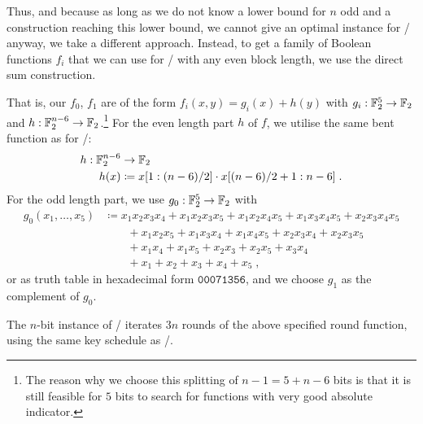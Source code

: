 Thus, and because as long as we do not know a lower bound for $n$ odd and a construction reaching this lower bound, we cannot give an optimal instance for \wisent/ anyway, we take a different approach.
Instead, to get a family of Boolean functions $f_i$ that we can use for \wisent/ with any even block length, we use the direct sum construction.

That is, our $f_0$, $f_1$ are of the form $f_i(x,y) = g_i(x) + h(y)$ with $g_i : \mathbb{F}_2^5 \to \mathbb{F}_2$ and $h : \mathbb{F}_2^{n-6} \to \mathbb{F}_2$.\footnote{%
    The reason why we choose this splitting of $n-1 = 5 + n-6$ bits is that it is still feasible for $5$ bits to search for functions with very good absolute indicator.
}
For the even length part $h$ of $f$, we utilise the same bent function as for \bison/:
\begin{align*}
    h : \mathbb{F}_2^{n-6} &\to \mathbb{F}_2 \\
    h(x) &\coloneqq x[1 : (n-6)/2] \cdot x[(n-6)/2 + 1 : n-6]\;.
\end{align*}
For the odd length part, we use $g_0 : \mathbb{F}_2^5 \to \mathbb{F}_2$ with
\begin{align*}
    g_0(x_1, \ldots, x_5) %
                          &\coloneqq x_1x_2x_3x_4 + x_1x_2x_3x_5 + x_1x_2x_4x_5 + x_1x_3x_4x_5 + x_2x_3x_4x_5 \\
                          &\qquad    + x_1x_2x_5 + x_1x_3x_4 + x_1x_4x_5 + x_2x_3x_4 + x_2x_3x_5 \\
                          &\qquad    + x_1x_4 + x_1x_5 + x_2x_3 + x_2x_5 + x_3x_4 \\
                          &\qquad    + x_1 + x_2 + x_3 + x_4 + x_5\;,
\end{align*}
or as truth table in hexadecimal form $\mathtt{00071356}$, and we choose $g_1$ as the complement of $g_0$.

The $n$-bit instance of \wisent/ iterates $3n$ rounds of the above specified round function, using the same key schedule as \bison/.

